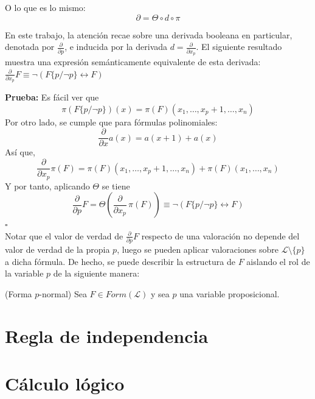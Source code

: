  \noindent O lo que es lo mismo: $$\partial = \Theta \circ d \circ \pi $$
 
 En este trabajo, la atención recae sobre una derivada booleana en particular, denotada por $\frac{\partial}{\partial p}$, e inducida por la derivada $d = \frac{\partial}{\partial x_p}$. El siguiente resultado muestra una expresión semánticamente equivalente de esta derivada:
\prop $\frac{\partial}{\partial x_p} F \equiv \neg (F\{ p/\neg p \} \leftrightarrow F) $

\noindent \textbf{Prueba:} Es fácil ver que
$$\pi (F\{ p/\neg p \}) (x) = \pi (F) (x_1, \dots , x_p +1 ,\dots , x_n)$$
\noindent Por otro lado, se cumple que para fórmulas polinomiales:
$$\frac{\partial}{\partial x}a(x) = a(x+1)+a(x)$$
\noindent Así que,
$$\frac{\partial}{\partial x_p} \pi (F) = \pi (F) (x_1, \dots , x_p +1 ,\dots , x_n) + \pi (F) (x_1, \dots , x_n)$$
\noindent Y por tanto, aplicando $\Theta$ se tiene
$$\frac{\partial}{\partial p} F = \Theta (\frac{\partial}{\partial x_p} \, \pi (F)) \equiv \neg (F\{ p/\neg p \} \leftrightarrow F)$$
\hspace{15cm} $\square$ \\

Notar que el valor de verdad de $\frac{\partial}{\partial p}F$ respecto de una valoración no depende del valor de verdad de la propia $p$, luego se pueden aplicar valoraciones sobre $\mathcal{L} \setminus \{ p \}$ a dicha fórmula. De hecho, se puede describir la estructura de $F$ aislando el rol de la variable $p$ de la siguiente manera:

\lem \cite{Borrego2009} (Forma $p$-normal) Sea $F \in Form(\mathcal{L})$ y sea $p$ una variable proposicional.

\section{Regla de independencia}

\section{Cálculo lógico}
